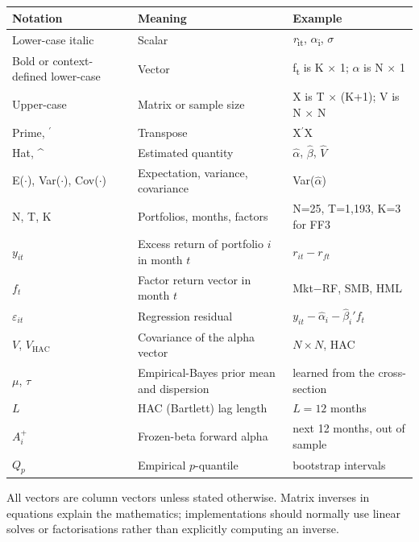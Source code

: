 \begin{longtable}[]{@{}p{}p{}p{}@{}}
\toprule\noalign{}
Notation & Meaning & Example \\
\midrule\noalign{}
\endhead
\bottomrule\noalign{}
\endlastfoot
Lower-case italic & Scalar & \emph{r}\textsubscript{it},
\ensuremath{\alpha }\textsubscript{i}, \ensuremath{\sigma } \\
Bold or context-defined lower-case & Vector & f\textsubscript{t} is K \ensuremath{\times }
1; \ensuremath{\alpha } is N \ensuremath{\times } 1 \\
Upper-case & Matrix or sample size & X is T \ensuremath{\times } (K+1); V is N \ensuremath{\times } N \\
Prime, \ensuremath{{}^{\prime}} & Transpose & X\ensuremath{{}^{\prime}}X \\
Hat, \textasciicircum{} & Estimated quantity & \ensuremath{\hat{\alpha }}, \ensuremath{\hat{\beta }}, \ensuremath{\hat{V}} \\
E(\ensuremath{\cdot }), Var(\ensuremath{\cdot }), Cov(\ensuremath{\cdot }) & Expectation, variance, covariance & Var(\ensuremath{\hat{\alpha }}) \\
N, T, K & Portfolios, months, factors & N=25, T=1,193, K=3 for FF3 \\
$y_{it}$ & Excess return of portfolio $i$ in month $t$ & $r_{it}-r_{ft}$ \\
$f_t$ & Factor return vector in month $t$ & Mkt$-$RF, SMB, HML \\
$\varepsilon_{it}$ & Regression residual & $y_{it}-\hat\alpha_i-\hat\beta_i' f_t$ \\
$V$, $V_{\mathrm{HAC}}$ & Covariance of the alpha vector & $N\times N$, HAC \\
$\mu$, $\tau$ & Empirical-Bayes prior mean and dispersion & learned from the
cross-section \\
$L$ & HAC (Bartlett) lag length & $L=12$ months \\
$A_i^{+}$ & Frozen-beta forward alpha & next 12 months, out of sample \\
$Q_p$ & Empirical $p$-quantile & bootstrap intervals \\
\end{longtable}

All vectors are column vectors unless stated otherwise. Matrix inverses
in equations explain the mathematics; implementations should normally
use linear solves or factorisations rather than explicitly computing an
inverse.

